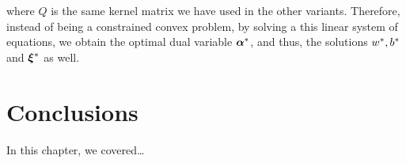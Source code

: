 where $Q$ is the same kernel matrix we have used in the other variants.
Therefore, instead of being a constrained convex problem, by solving a this linear system of equations, we obtain the optimal dual variable ${\bm{\alpha}}^*$, and thus, the solutions ${w}^*, {b}^*$ and ${\bm{\xi}}^*$ as well.

\section{Conclusions}\label{sec-conclusions-1}

In this chapter, we covered\dots
